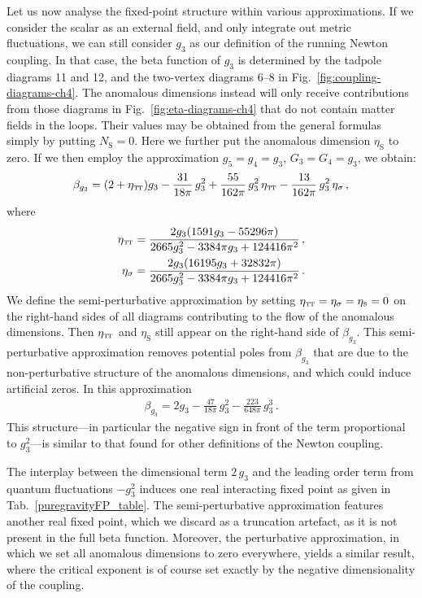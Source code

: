 \documentclass[11pt]{book}
\newcommand\TTspace{ -1pt }
\newcommand\etaTT{ \eta_{\scriptscriptstyle{\mathrm{T\hspace{\TTspace}T}}} }
\newcommand\etaS{ \eta_{\scriptscriptstyle{\mathrm{S}}} }
\newcommand\NS{ N_{\scriptscriptstyle{\mathrm{S}}} }
\numberwithin{equation}{chapter}
\begin{document}
Let us now analyse the fixed-point structure within various approximations.
If we consider the scalar as an external field, and only integrate out metric fluctuations,
we can still consider $g_3$ as our definition of the running Newton coupling.
In that case, the beta function of ${g_3}$ is determined by the tadpole diagrams 11 and 12,
and the two-vertex diagrams 6--8 in Fig.~\ref{fig:coupling-diagrams-ch4}.
The anomalous dimensions instead will only receive contributions from those diagrams
in Fig.~\ref{fig:eta-diagrams-ch4}
that do not contain matter fields in the loops.
Their values may be obtained from the general formulas simply by putting $\NS=0$.
Here we further put the anomalous dimension $\etaS$ to zero.
If we then employ the approximation $g_5 = g_4 = g_3$, $G_3 = G_4 = g_3$, we obtain:
\begin{align}
  \beta_{g_3} = (2+\etaTT) g_3
              - \frac{31}{18 \pi} \, g_3^2
              + \frac{55}{162\pi} \, g_3^2 \, \etaTT
              - \frac{13}{162\pi} \, g_3^2 \, \eta_\sigma \,,
\end{align}
where
\begin{align}
  \etaTT      &= \frac{2g_3(1591 g_3-55296 \pi)}{2665 g_3^2-3384\pi g_3 +124416 \pi^2}  \,, \\
  \eta_\sigma &= \frac{2g_3(16195 g_3+32832 \pi)}{2665 g_3^2-3384\pi g_3 +124416 \pi^2} \,.
\end{align}
We define the semi-perturbative approximation by setting
$\etaTT = \eta_{\sigma} = \etaS = 0$ on the right-hand sides of all diagrams contributing
to the flow of the anomalous dimensions.
Then $\etaTT$ and $\etaS$ still appear on the right-hand side of $\beta_{g_3}$.
This semi-perturbative approximation removes potential poles from $\beta_{g_3}$ that are
due to the non-perturbative structure of the anomalous dimensions,
and which could induce artificial zeros.  In this approximation
\begin{align}
  \beta_{g_3} = 2g_3 - \frac{47}{18 \pi} \, g_3^2 - \frac{223}{648\pi} \, g_3^3 \,.
  \label{purgravitysemipertbeta}
\end{align}
This structure---in particular the negative sign in front of the term proportional to $g_3^2$---is
similar to that found for other definitions of the Newton coupling.

The interplay between the dimensional term $2 \, g_3$ and the leading order term from quantum fluctuations
$-g_3^2$ induces one real interacting fixed point as given in Tab.~\ref{puregravityFP_table}.
The semi-perturbative approximation features another real fixed point,
which we discard as a truncation artefact, as it is not present in the full beta function.
Moreover, the perturbative approximation, in which we set all anomalous dimensions to zero everywhere,
yields a similar result, where the critical exponent is of course set exactly by the negative dimensionality
of the coupling.
\end{document}
